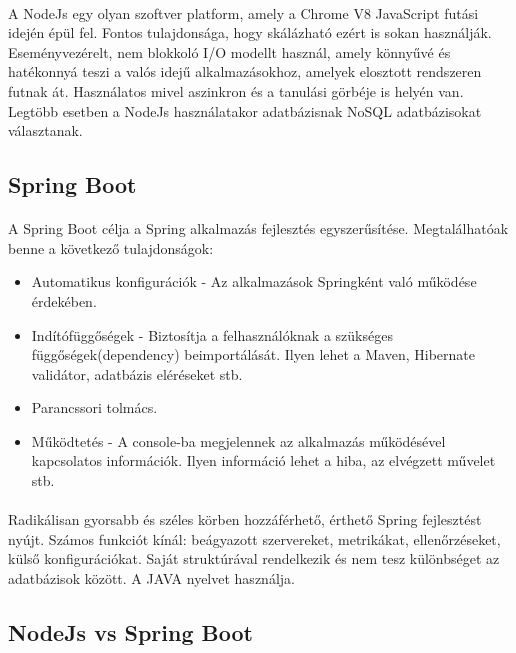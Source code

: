 	\paragraph{} 
	A NodeJs \cite{js2016node} egy olyan szoftver platform, amely a Chrome V8 JavaScript futási idején épül fel. Fontos tulajdonsága, hogy skálázható ezért is sokan használják. Eseményvezérelt, nem blokkoló I/O modellt használ, amely könnyűvé és hatékonnyá teszi a valós idejű alkalmazásokhoz, amelyek elosztott rendszeren futnak át. Használatos mivel aszinkron és a tanulási görbéje is helyén van. Legtöbb esetben a NodeJs használatakor adatbázisnak NoSQL adatbázisokat választanak.
	
	\subsection{Spring Boot}
	\paragraph{}
	A Spring Boot \cite{jovanovic2017java} célja a Spring alkalmazás fejlesztés egyszerűsítése. Megtalálhatóak benne a következő tulajdonságok:
	\begin{itemize}
		\item Automatikus konfigurációk - Az alkalmazások Springként való működése érdekében.
		\item Indítófüggőségek - Biztosítja a felhasználóknak a szükséges függőségek(dependency) beimportálását. Ilyen lehet a Maven, Hibernate validátor, adatbázis eléréseket stb.
		\item Parancssori tolmács.
		\item Működtetés - A console-ba megjelennek az alkalmazás működésével kapcsolatos információk. Ilyen információ lehet a hiba, az elvégzett művelet stb.
	\end{itemize}
	
	\paragraph{}
	Radikálisan gyorsabb és széles körben hozzáférhető, érthető Spring fejlesztést nyújt. Számos funkciót kínál: beágyazott szervereket, metrikákat, ellenőrzéseket, külső konfigurációkat. Saját struktúrával rendelkezik és nem tesz különbséget az adatbázisok között. A JAVA nyelvet használja.
	
	\subsection{NodeJs vs Spring Boot}
